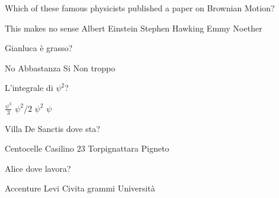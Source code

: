 \documentclass{exam}
\begin{document}
\begin{center}
\end{center}
\vspace{5mm}
\vspace{5mm}
\vspace{5mm}
\begin{questions}
\question[10] Which of these famous physicists published a paper on Brownian Motion?
\begin{choices}
\choice This makes no sense
\choice Albert Einstein
\choice Stephen Hawking 
\choice Emmy Noether
\end{choices}
\question[10] Gianluca è grasso?
\begin{choices}
\choice No
\choice Abbastanza
\choice Si
\choice Non troppo
\end{choices}
\question[10] L'integrale di $\psi^{2}$?
\begin{choices}
\choice $\frac{\psi^{3}}{3}$
\choice $\psi^{2}/2$
\choice $\psi^{2}$
\choice $\psi$
\end{choices}
\question[10] Villa De Sanctis dove sta?
\begin{choices}
\choice Centocelle
\choice Casilino 23
\choice Torpignattara
\choice Pigneto
\end{choices}
\question[10] Alice dove lavora?
\begin{choices}
\choice Accenture
\choice Levi Civita
 grammi
\choice Università
\end{choices}
\end{questions}
           
\end{document}
